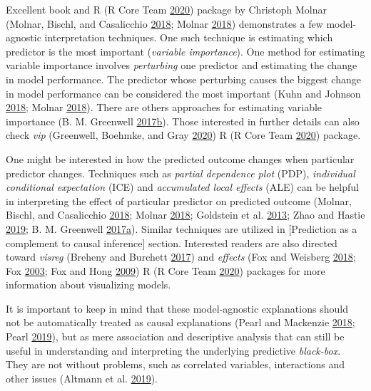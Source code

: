 \documentclass[
]{book}
\begin{document}
Excellent book and R (R Core Team \protect\hyperlink{ref-R-base}{2020}) package by Christoph Molnar (Molnar, Bischl, and Casalicchio \protect\hyperlink{ref-molnarImlPackageInterpretable2018}{2018}; Molnar \protect\hyperlink{ref-molnarInterpretableMachineLearning2018}{2018}) demonstrates a few model-agnostic interpretation techniques. One such technique is estimating which predictor is the most important (\emph{variable importance}). One method for estimating variable importance involves \emph{perturbing} one predictor and estimating the change in model performance. The predictor whose perturbing causes the biggest change in model performance can be considered the most important (Kuhn and Johnson \protect\hyperlink{ref-kuhnAppliedPredictiveModeling2018}{2018}; Molnar \protect\hyperlink{ref-molnarInterpretableMachineLearning2018}{2018}). There are others approaches for estimating variable importance (B. M. Greenwell \protect\hyperlink{ref-RJ-2017-016}{2017}\protect\hyperlink{ref-RJ-2017-016}{b}). Those interested in further details can also check \emph{vip} (Greenwell, Boehmke, and Gray \protect\hyperlink{ref-R-vip}{2020}) R (R Core Team \protect\hyperlink{ref-R-base}{2020}) package.

One might be interested in how the predicted outcome changes when particular predictor changes. Techniques such as \emph{partial dependence plot} (PDP), \emph{individual conditional expectation} (ICE) and \emph{accumulated local effects} (ALE) can be helpful in interpreting the effect of particular predictor on predicted outcome (Molnar, Bischl, and Casalicchio \protect\hyperlink{ref-molnarImlPackageInterpretable2018}{2018}; Molnar \protect\hyperlink{ref-molnarInterpretableMachineLearning2018}{2018}; Goldstein et al. \protect\hyperlink{ref-goldsteinPeekingBlackBox2013}{2013}; Zhao and Hastie \protect\hyperlink{ref-zhaoCausalInterpretationsBlackBox2019}{2019}; B. M. Greenwell \protect\hyperlink{ref-R-pdp}{2017}\protect\hyperlink{ref-R-pdp}{a}). Similar techniques are utilized in {[}Prediction as a complement to causal inference{]} section. Interested readers are also directed toward \emph{visreg} (Breheny and Burchett \protect\hyperlink{ref-R-visreg}{2017}) and \emph{effects} (Fox and Weisberg \protect\hyperlink{ref-R-effects_a}{2018}; Fox \protect\hyperlink{ref-R-effects_b}{2003}; Fox and Hong \protect\hyperlink{ref-R-effects_c}{2009}) R (R Core Team \protect\hyperlink{ref-R-base}{2020}) packages for more information about visualizing models.

It is important to keep in mind that these model-agnostic explanations should not be automatically treated as causal explanations (Pearl and Mackenzie \protect\hyperlink{ref-pearlBookWhyNew2018}{2018}; Pearl \protect\hyperlink{ref-pearlSevenToolsCausal2019}{2019}), but as mere association and descriptive analysis that can still be useful in understanding and interpreting the underlying predictive \emph{black-box}. They are not without problems, such as correlated variables, interactions and other issues (Altmann et al. \protect\hyperlink{ref-altmannLimitationsInterpretableMachine2019}{2019}).
\end{document}
